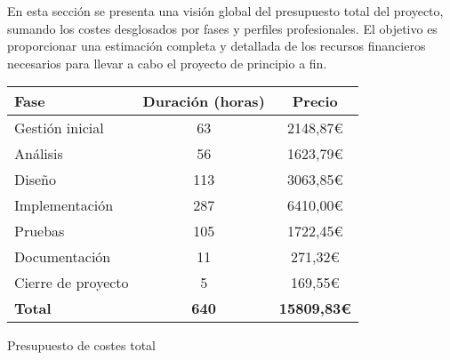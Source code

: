 En esta sección se presenta una visión global del presupuesto total del proyecto, sumando los costes desglosados por fases y perfiles profesionales.
El objetivo es proporcionar una estimación completa y detallada de los recursos financieros necesarios para llevar a cabo el proyecto de principio a fin.

\begin{planificacion}
	\centering
	\begin{tabular}{ | m{9cm} | c | c |}
		\hline
		\textbf{Fase}      & \textbf{Duración (horas)} & \textbf{Precio}    \\\hline
		Gestión inicial    & 63                        & 2148,87€           \\\hline
		Análisis           & 56                        & 1623,79€           \\\hline
		Diseño             & 113                       & 3063,85€           \\\hline
		Implementación     & 287                       & 6410,00€           \\\hline
		Pruebas            & 105                       & 1722,45€           \\\hline
		Documentación      & 11                        & 271,32€            \\\hline
		Cierre de proyecto & 5                         & 169,55€            \\\hline
		\textbf{Total}     & \textbf{640}              & \textbf{15809,83€} \\\hline
	\end{tabular}
	\caption{Presupuesto de costes total}
\end{planificacion}
